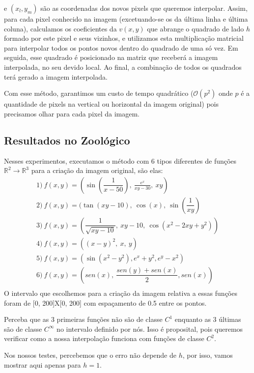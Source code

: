 \documentclass{article}
\begin{document}
	  e $(x_{l}, y_{m})$ são as coordenadas dos novos pixels que queremos interpolar. Assim, para cada pixel conhecido na imagem (excetuando-se os da última linha e última coluna), calculamos os coeficientes da $v(x,y)$ que abrange o quadrado de lado $h$ formado por este pixel e seus vizinhos, e utilizamos esta multiplicação matricial para interpolar todos os pontos novos dentro do quadrado de uma só vez. Em seguida, esse quadrado é posicionado na matriz que receberá a imagem interpolada, no seu devido local. Ao final, a combinação de todos os quadrados terá gerado a imagem interpolada. \par
	 Com esse método, garantimos um custo de tempo quadrático ($\mathcal{O}(p^2)$ onde $p$ é a quantidade de pixels na vertical ou horizontal da imagem original) pois precisamos olhar para cada pixel da imagem.
		\subsection{Resultados no Zoológico}
		Nesses experimentos, executamos o método com 6 tipos diferentes de funções $\mathbb{R}^2 \rightarrow \mathbb{R}^3$ para a criação da imagem original, são elas:
		\[
			\begin{array}{llllll}
			1)\ f(x, y) = (\sin(\dfrac{1}{x-50}),\ \frac{e^x}{xy - 30},\ xy) \\
			2)\ f(x, y) = (\tan(xy - 10),\ \cos(x),\ \sin(\dfrac{1}{xy}) \\
			3)\ f(x, y) = (\dfrac{1}{\sqrt{xy - 10}},\ xy - 10,\ \cos(x^2 - 2xy + y^2)) \\
			4)\ f(x, y) = ((x - y)^2,\ x,\ y) \\
			5)\ f(x, y) = (\sin(x^2 - y^2), e^x + y^2, e^y - x^2) \\
			6)\ f(x, y) = (sen(x),\ \dfrac{sen(y) + sen(x)}{2}, sen(x)) \\
			\end{array}
		\]
		O intervalo que escolhemos para a criação da imagem relativa a essas funções foram de [0, 200]X[0, 200] com espaçamento de 0.5 entre os pontos. \par
		Perceba que as 3 primeiras funções não são de classe $C^1$ enquanto as 3 últimas são de classe $C^\infty$ no intervalo definido por nós. Isso é proposital, pois queremos verificar como a nossa interpolação funciona com funções de classe $C^2$. \par
		Nos nossos testes, percebemos que o erro não depende de $h$, por isso, vamos mostrar aqui apenas para $h = 1$. \par
\end{document}
